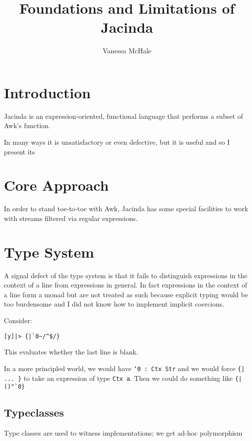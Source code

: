 \documentclass{report}
\begin{document}
\title{Foundations and Limitations of Jacinda}
\author {Vanessa McHale}
\maketitle

\tableofcontents

\section{Introduction}

Jacinda is an expression-oriented, functional language that performs a subset of Awk's function.

In many ways it is unsatisfactory or even defective, but it is useful and so I present its

\section{Core Approach}

In order to stand toe-to-toe with Awk, Jacinda has some special facilities to work with streams filtered via regular expressions.

\section{Type System}

A signal defect of the type system is that it fails to distinguish expressions in the context of a line from expressions in general. In fact expressions in the context of a line form a monad but are not treated as such because explicit typing would be too burdensome and I did not know how to implement implicit coercions.

Consider:

\begin{verbatim}
[y]|> {|`0~/^$/}
\end{verbatim}

This evaluates whether the last line is blank.

In a more principled world, we would have {\tt `0 : Ctx Str} and we would force {\tt \{| ... \}} to take an expression of type {\tt Ctx a}. Then we could do something like {\tt \{|()"`0\}}

\subsection{Typeclasses}

Type classes are used to witness implementations; we get ad-hoc polymorphism \cite{adhoc}



\end{document}
